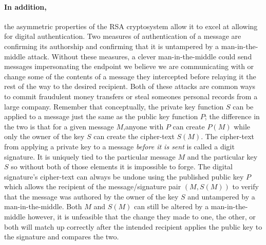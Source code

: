 \documentclass[12pt]{article}
\theoremstyle{remark}
\begin{document}
\paragraph{In addition,} the asymmetric properties of the RSA cryptosystem allow it to excel at allowing for digital authentication.  Two measures of authentication of a message are confirming its authorship and confirming that it is untampered by a man-in-the-middle attack.  Without these measures, a clever man-in-the-middle could send messages impersonating the endpoint we believe we are communicating with or change some of the contents of a message they intercepted before relaying it the rest of the way to the desired recipient.  Both of these attacks are common ways to commit fraudulent money transfers or steal someones personal records from a large company.  Remember that conceptually, the private key function $S$ can be applied to a message just the same as the public key function $P$; the difference in the two is that for a given message $M$,anyone with $P$ can create $P(M)$ while only the owner of the key $S$ can create the cipher-text $S(M)$.  The cipher-text from applying a private key to a message \emph{before it is sent} is called a digit signature.  It is uniquely tied to the particular message $M$ and the particular key $S$ so without both of those elements it is impossible to forge.  The digital signature's cipher-text can always be undone using the published public key $P$ which allows the recipient of the message/signature pair $(M,S(M))$ to verify that the message was authored by the owner of the key $S$ and untampered by a man-in-the-middle.  Both $M$ and $S(M)$ can still be altered by a man-in-the-middle however, it is unfeasible that the change they made to one, the other, or both will match up correctly after the intended recipient applies the public key to the signature and compares the two.
\end{document}
